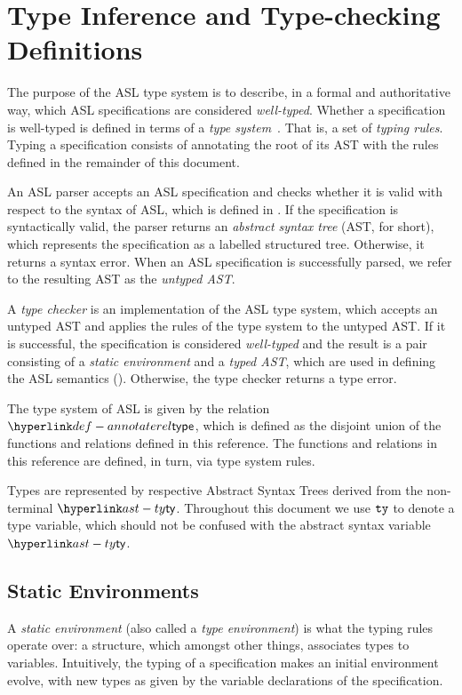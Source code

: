 \chapter{Type Inference and Type-checking Definitions\label{chap:TypeChecking}}

The purpose of the ASL type system is to describe, in a formal and authoritative way,
which ASL specifications are considered \emph{well-typed}.
Whether a specification is well-typed is defined in terms of a \emph{type system}~\cite{TypeSystemsLucaCardelli}.
That is, a set of \emph{typing rules}.
Typing a specification consists of annotating the root of its AST with the rules defined
in the remainder of this document.

An ASL parser accepts an ASL specification and checks whether it is valid with respect to the syntax of ASL,
which is defined in .
If the specification is syntactically valid, the parser returns an \emph{abstract syntax tree} (AST, for short),
which represents the specification as a labelled structured tree. Otherwise, it returns a syntax error.
When an ASL specification is successfully parsed, we refer to the resulting AST as the \emph{untyped AST}.

A \emph{type checker} is an implementation of the ASL type system, which accepts an untyped AST and applies the
rules of the type system to the untyped AST. If it is successful, the specification
is considered \emph{well-typed} and the result is a pair consisting of
a \emph{static environment} and a \emph{typed AST},
which are used in defining the ASL semantics ().
Otherwise, the type checker returns a type error.

\hypertarget{def-annotaterel}{}
The type system of ASL is given by the relation $\annotaterel$, which is defined as the disjoint union
of the functions and relations defined in this reference.
The functions and relations in this reference are defined, in turn, via type system rules.

Types are represented by respective Abstract Syntax Trees derived from the non-terminal $\ty$.
Throughout this document we use $\texttt{ty}$ to denote a type variable, which should not be confused with the abstract syntax variable $\ty$.

\section{Static Environments \label{sec:StaticEnvironments}}

A \emph{static environment} (also called a \emph{type environment}) is what the typing rules operate over:
a structure, which amongst other things, associates types to variables.
Intuitively, the typing of a specification makes an initial environment evolve, with new types as given by the
variable declarations of the specification.

